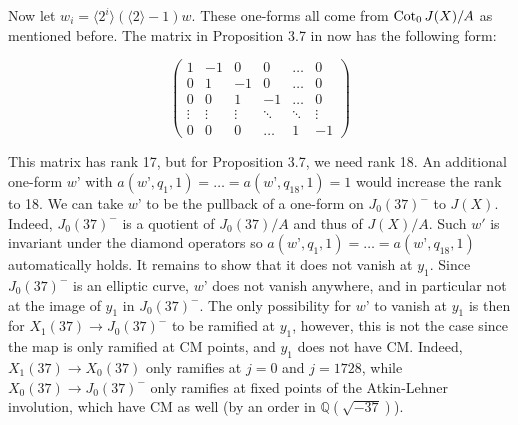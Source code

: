 \documentclass[11pt,reqno]{amsart}
\theoremstyle{plain}
\theoremstyle{definition}
\begin{document}
Now let $w_i =  \langle 2^i\rangle(\langle2\rangle - 1)w$. These one-forms all come from ${\rm Cot}_0 \,J(X)/A$ as mentioned before.
The matrix in Proposition 3.7 in \cite{Version1} now has the following form:

\[
\begin{pmatrix}
1& -1& 0& 0& \ldots& 0 \\
0& 1& -1& 0& \ldots& 0 \\
0& 0& 1& -1& \ldots & 0 \\
\vdots&  \vdots  & \vdots   &   \ddots &  \ddots & \vdots\\
0& 0& 0& \ldots & 1 & -1
\end{pmatrix}
\]

This matrix has rank 17, but for Proposition 3.7, we need rank 18.
An additional one-form $w’$ with $a(w’,q_1,1) = \ldots = a(w’,q_{18},1) = 1$ would increase
the rank to 18.
We can take $w’$ to be the pullback of a one-form on $J_0(37)^-$ to $J(X)$. Indeed, $J_0(37)^-$ is a quotient of
$J_0(37)/A$ and thus of $J(X)/A$. Such $w'$ is invariant under the diamond operators so $a(w’,q_1,1) = \ldots = a(w’,q_{18},1)$
automatically holds. It remains to show that it does not vanish at $y_1$.  
Since $J_0(37)^-$ is an elliptic curve, $w’$ does not vanish anywhere,
and in particular not at the image of $y_1$ in $J_0(37)^-$.
The only possibility for $w’$ to vanish at $y_1$ is then for $X_1(37) \rightarrow J_0(37)^-$
to be ramified at $y_1$, however, this is not the case since the map is only ramified at CM points, and $y_1$ does not have CM. 
Indeed, $X_1(37) \rightarrow X_0(37)$ only ramifies at $j=0$ and $j=1728$,
while $X_0(37) \rightarrow J_0(37)^-$ only ramifies at fixed points of the Atkin-Lehner involution, which have CM as well (by an order in $\mathbb Q(\sqrt{-37})$).





\end{document}
